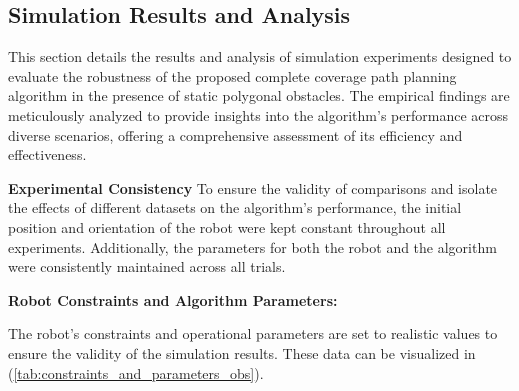 \vspace*{6mm}  



\subsection{Simulation Results and Analysis}

This section details the results and analysis of simulation experiments designed to evaluate the robustness of the proposed complete coverage path planning algorithm in the presence of static polygonal obstacles. The empirical findings are meticulously analyzed to provide insights into the algorithm's performance across diverse scenarios, offering a comprehensive assessment of its efficiency and effectiveness.

\vspace*{6mm}  

\textbf{Experimental Consistency}
To ensure the validity of comparisons and isolate the effects of different datasets on the algorithm's performance, the initial position and orientation of the robot were kept constant throughout all experiments. Additionally, the parameters for both the robot and the algorithm were consistently maintained across all trials.

\vspace*{6mm}  

\textbf{Robot Constraints and Algorithm Parameters: } 


The robot's constraints and operational parameters are set to realistic values to ensure the validity of the simulation results. These data can be visualized in (\autoref{tab:constraints_and_parameters_obs}).

